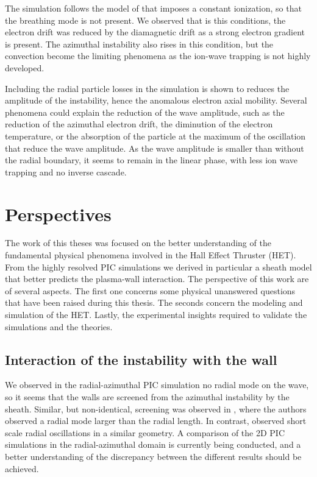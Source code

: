 The simulation follows the model of \citet{boeuf2018} that imposes a constant ionization, so that the breathing mode is not present.
We observed that is this conditions, the electron drift was reduced by the diamagnetic drift as a strong electron gradient is present.
The azimuthal instability also rises in this condition, but the convection become the limiting phenomena as the ion-wave trapping is not highly developed.

Including the radial particle losses in the simulation is shown to reduces the amplitude of the instability, hence the anomalous electron axial mobility.
Several phenomena could explain the reduction of the wave amplitude, such as the reduction of the azimuthal electron drift, the diminution of the electron temperature, or the absorption of the particle at the maximum of the oscillation that reduce the wave amplitude.
As the wave amplitude is smaller than without the radial boundary, it seems to remain in the linear phase, with less ion wave trapping and no inverse cascade.

\section{Perspectives}

The work of this theses was focused on the better understanding of the fundamental physical phenomena involved in the Hall Effect Thruster (HET).
From the highly resolved PIC simulations we derived in particular a sheath model that better predicts the plasma-wall interaction.
The perspective of this work are of several aspects.
The first one concerns some physical unanswered questions that have been raised during this thesis.
The seconds concern the modeling and simulation of the HET.
Lastly, the experimental insights required to validate the simulations and the theories.

\subsection{Interaction of the instability with the wall}

We observed in the radial-azimuthal PIC simulation no radial mode on the wave, so it seems that the walls are screened from the azimuthal instability by the sheath.
Similar, but non-identical, screening was observed in \citet{janhunen2018}, where the authors observed a radial mode larger than the radial length.
In contrast, \citet{taccogna2019} observed short scale radial oscillations in a similar geometry.
A comparison of the 2D PIC simulations in the radial-azimuthal domain is currently being conducted, and a better understanding of the discrepancy between the different results should be achieved.

